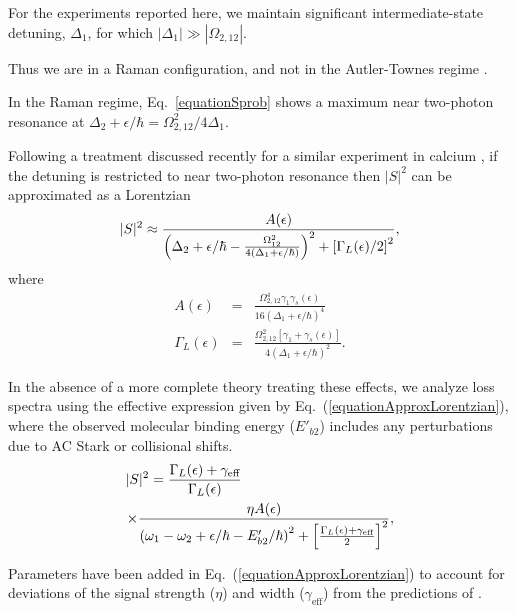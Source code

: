 For the experiments reported here, we maintain significant intermediate-state detuning, $\Delta_1$, for which $|\Delta_1|\gg |\Omega_{2,12}|$.

Thus we are in a Raman configuration, and not in the Autler-Townes regime \cite{mmp08}.

In the Raman regime, Eq.\ \ref{equationSprob} shows a maximum near two-photon resonance at $\Delta_2+\epsilon/\hbar =\Omega_{2,12}^2/4\Delta_1$.

Following a treatment discussed recently for a similar experiment in calcium \cite{Pachomow2017a}, if the detuning is restricted to near two-photon resonance then $\vert S\vert^2$ can be approximated as a Lorentzian
\begin{eqnarray}
 \vert S\vert^2 \approx {A(\epsilon) \over
 \left(\Delta_2+\epsilon/\hbar-\frac{\Omega_{12}^{2}}{4(\Delta_1+\epsilon/\hbar)}\right)^2+\left[ {\Gamma_L(\epsilon)}/{2}\right]^2},
\end{eqnarray}
where 
\begin{eqnarray}\label{ApproxLorentzianQuantitiesMain}
  A(\epsilon)&=& \frac{\Omega_{2,12}^{4}\gamma_1 \gamma_s(\epsilon)}{16(\Delta_1+\epsilon/\hbar)^4} \\
  \label{ApproxLorentzianQuantities-2Main}
  \Gamma_L(\epsilon)&=& \frac{\Omega_{2,12}^{2}[\gamma_1 +\gamma_s(\epsilon)]}{4(\Delta_1+\epsilon/\hbar)^2}.
\end{eqnarray}

In the absence of a more complete theory treating these effects, we analyze loss spectra using the effective expression given by Eq.\ (\ref{equationApproxLorentzian}), where the observed molecular binding energy ($E'_{b2}$) includes any perturbations due to AC Stark or collisional shifts.
\vbox{
\begin{eqnarray}\label{equationApproxLorentzian}
  \vert S\vert^2 = \frac{\Gamma_L(\epsilon)+\gamma_{\text{eff}}}{\Gamma_L(\epsilon)}\hspace{1.5in} \nonumber \\
  \times \frac{\eta  A(\epsilon)} {\left(\omega_1-\omega_2+\epsilon/\hbar-E'_{b2}/\hbar\right)^2+\left[
  	\frac{\Gamma_L(\epsilon)+\gamma_{\text{eff}}}{2}\right]^2},
\end{eqnarray}}







Parameters have been added in Eq.\ (\ref{equationApproxLorentzian}) to account for deviations of the signal strength ($\eta$) and width ($\gamma_{\text{eff}}$) from the predictions of \cite{bju96}.

